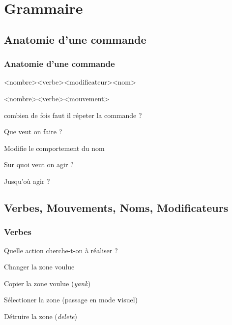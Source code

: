 \documentclass{beamer}
\begin{document}
\section{Grammaire}
\frame{\tableofcontents[currentsection]}
\subsection{Anatomie d'une commande}
\frame{\tableofcontents[currentsubsection]}


\begin{frame}
\frametitle{Anatomie d'une commande}
\begin{center}
    \Large{<nombre><verbe><modificateur><nom>}

    \Large{<nombre><verbe><mouvement>}
\end{center}
\pause{}
\begin{description}[<+->]
    \item[nombre] combien de fois faut il répeter la commande ?
    \item[verbe] Que veut on faire ?
    \item[modificateur] Modifie le comportement du nom
    \item[nom] Sur quoi veut on agir ?
    \item[mouvement] Jusqu'où agir ?
\end{description}
\end{frame}

\subsection{Verbes, Mouvements, Noms, Modificateurs}
\frame{\tableofcontents[currentsubsection]}

\begin{frame}
\frametitle{Verbes}

Quelle action cherche-t-on à réaliser ?
\pause{}
\begin{description}[<+->]
    \item[c] Changer la zone voulue
    \item[y] Copier la zone voulue ({\it yank})
    \item[v] Sélectioner la zone (passage en mode {\bf v}isuel)
    \item[d] Détruire la zone ({\it delete})
\end{description}
    
\end{frame}
\end{document}
